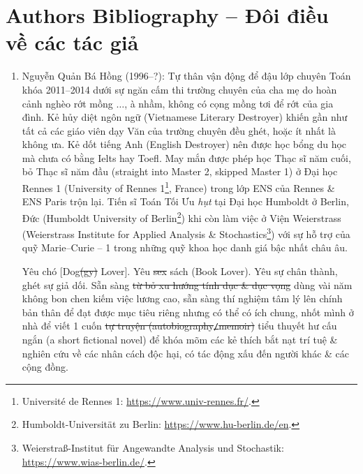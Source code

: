 \documentclass[12pt,twoside]{book}
\begin{document}
\chapter{Authors Bibliography -- Đôi điều về các tác giả}
\minitoc
\begin{enumerate}
	\item {\sc Nguyễn Quản Bá Hồng} (1996--?): Tự thân vận động để đậu lớp chuyên Toán khóa 2011--2014 dưới sự ngăn cấm thi trường chuyên của cha mẹ do hoàn cảnh nghèo rớt mồng $\ldots$, à nhầm, không có cọng mồng tơi để rớt của gia đình. Kẻ hủy diệt ngôn ngữ (Vietnamese Literary Destroyer) khiến gần như tất cả các giáo viên dạy Văn của trường chuyên đều ghét, hoặc ít nhất là không ưa. Kẻ dốt tiếng Anh (English Destroyer) nên được học bổng du học mà chưa có bằng {\sc Ielts} hay {\sc Toefl}. May mắn được phép học Thạc sĩ năm cuối, bỏ Thạc sĩ năm đầu (straight into Master 2, skipped Master 1) ở Đại học Rennes 1 (University of Rennes 1\footnote{Universit\'e de Rennes 1: \url{https://www.univ-rennes.fr/}.}, France) trong lớp ENS của Rennes \& ENS Paris trộn lại. Tiến sĩ Toán Tối Ưu {\it hụt} tại Đại học Humboldt ở Berlin, Đức (Humboldt University of Berlin\footnote{Humboldt-Universität zu Berlin: \url{https://www.hu-berlin.de/en}.}) khi còn làm việc ở Viện Weierstrass (Weierstrass Institute for Applied Analysis \& Stochastics\footnote{Weierstraß-Institut für Angewandte Analysis und Stochastik: \url{https://www.wias-berlin.de/}.}) với sự hỗ trợ của quỹ Marie--Curie -- 1 trong những quỹ khoa học danh giá bậc nhất châu {\sc âu}.
	
	Yêu chó [Dog\st{(gy)} Lover]. Yêu \st{sex} sách (Book Lover). Yêu sự chân thành, ghét sự giả dối. Sẵn sàng \st{từ bỏ xu hướng tính dục \& dục vọng} dùng vài năm không bon chen kiếm việc lương cao, sẵn sàng thí nghiệm tâm lý lên chính bản thân để đạt được mục tiêu riêng nhưng có thể có ích chung, nhốt mình ở nhà để viết 1 cuốn \st{tự truyện (autobiography{\tt/}memoir)} tiểu thuyết hư cấu ngắn (a short fictional novel) để khóa mõm các kẻ thích bắt nạt trí tuệ \& nghiên cứu về các nhân cách độc hại, có tác động xấu đến người khác \& các cộng đồng.
	

\end{enumerate}
\end{document}
